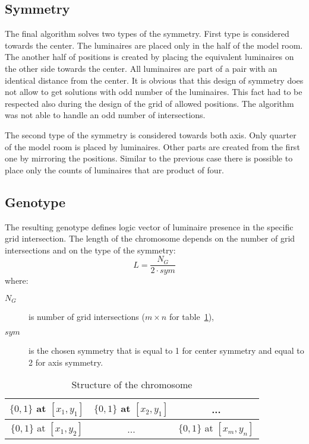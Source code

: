 \subsection{Symmetry}
The final algorithm solves two types of the symmetry. First type is considered towards the center. The luminaires are placed only in the half of the model room. The another half of positions is created by placing the equivalent luminaires on the other side towards the center. All luminaires are part of a pair with an identical distance from the center. It is obvious that this design of symmetry does not allow to get solutions with odd number of the luminaires. This fact had to be respected also during the design of the grid of allowed positions. The algorithm was not able to handle an odd number of intersections.

The second type of the symmetry is considered towards both axis. Only quarter of the model room is placed by luminaires. Other parts are created from the first one by mirroring the positions. Similar to the previous case there is possible to place only the counts of luminaires that are product of four.

\subsection{Genotype}
The resulting genotype defines logic vector of luminaire presence in the specific grid intersection. The length of the chromosome depends on the number of grid intersections and on the type of the symmetry:
\begin{equation}
\label{eq:chromLength}
L = \frac{N_G}{2\cdot sym}
\end{equation}
where:
\begin{description}
	\item[$N_G$] is number of grid intersections ($m\times n$ for table~\ref{tab:strucgenotype}),
	\item[$sym$] is the chosen symmetry that is equal to 1 for center symmetry and equal to 2 for axis symmetry.
\end{description}

\begin{table}[htb]
	\renewcommand{\arraystretch}{1.3}
	\caption{Structure of the chromosome}
 	\label{tab:strucgenotype}
	\centering
  \begin{tabular}{| c | c | c |}
    \hline
    $\lbrace0,1\rbrace$ at $[x_1,y_1]$ & $\lbrace0,1\rbrace$ at $[x_2,y_1]$ & ... \\
    \hline
    $\lbrace0,1\rbrace$ at $[x_1,y_2]$ & ... & $\lbrace0,1\rbrace$ at $[x_m,y_n]$ \\
    \hline
  \end{tabular}
\end{table}

